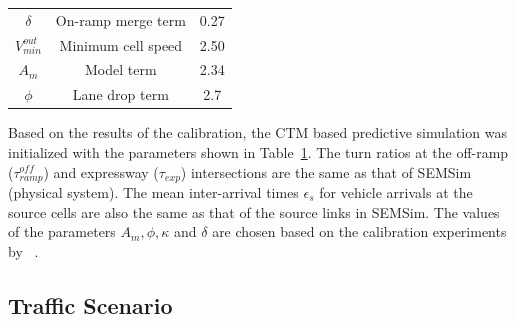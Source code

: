 \documentclass{wscpaperproc}
\theoremstyle{wsc}
\begin{document}
\begin{table}[!htbp]
\begin{tabular}{ccc}
$\delta$                                                                 & On-ramp merge term                                                                       & 0.27           \\
$V^{out}_{min}$                                                                 & Minimum cell speed                                                                       & 2.50           \\
$A_{m}$                                                                 & Model term                                                                       & 2.34           \\
$\phi$                                                                   & Lane drop term                                                                           & 2.7           
\\ \hline
\end{tabular}
\label{table:ctm-param}
\end{table}


Based on the results of the calibration, the CTM based predictive simulation was initialized with the parameters shown in Table~\ref{table:ctm-param}. The turn ratios at the off-ramp ($\tau_{ramp}^{off}$) and expressway ($\tau_{exp}$) intersections are the same as that of SEMSim (physical system). The mean inter-arrival times $\epsilon_{s}$ for vehicle arrivals at the source cells are also the same as that of the source links in SEMSim. The values of the parameters $A_m, \phi, \kappa$ and $\delta$ are chosen based on the calibration experiments by ~.

\subsection{Traffic Scenario}
\end{document}
